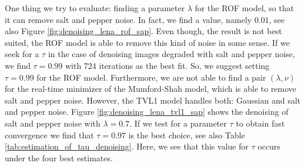 \documentclass[abstracton]{scrreprt}
\begin{document}
            One thing we try to evaluate: finding a parameter $\lambda$ for the ROF model, so that it can remove salt and pepper noise. In fact, we find a value, namely $0.01$, see also Figure \ref{fig:denoising_lena_rof_sap}. Even though, the result is not best suited, the ROF model is able to remove this kind of noise in some sense. If we seek for a $\tau$ in the case of denoising images degraded with salt and pepper noise, we find $\tau = 0.99$ with $724$ iterations as the best fit. So, we suggest setting $\tau = 0.99$ for the ROF model. Furthermore, we are not able to find a pair $(\lambda, \nu)$ for the real-time minimizer of the Mumford-Shah model, which is able to remove salt and pepper noise. However, the TVL1 model handles both: Gaussian and salt and pepper noise. Figure \ref{fig:denoising_lena_tvl1_sap} shows the denoising of salt and pepper noise with $\lambda = 0.7$. If we test for a parameter $\tau$ to obtain fast convergence we find that $\tau = 0.97$ is the best choice, see also Table \ref{tab:estimation_of_tau_denoising}. Here, we see that this value for $\tau$ occurs under the four best estimates.
\end{document}
